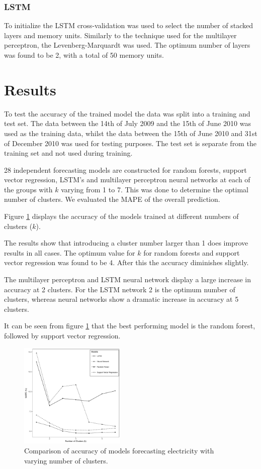 \subsubsection{LSTM}

To initialize the LSTM cross-validation was used to select the number of stacked layers and memory units. Similarly to the technique used for the multilayer perceptron, the Levenberg-Marquardt was used. The optimum number of layers was found to be 2, with a total of 50 memory units.



\section{Results}

To test the accuracy of the trained model the data was split into a training and test set. The data between the 14th of July 2009 and the 15th of June 2010 was used as the training data, whilst the data between the 15th of June 2010 and 31st of December 2010 was used for testing purposes. The test set is separate from the training set and not used during training. 

28 independent forecasting models are constructed for random forests, support vector regression, LSTM's and multilayer perceptron neural networks at each of the groups with $k$ varying from 1 to 7. This was done to determine the optimal number of clusters. We evaluated the MAPE of the overall prediction. 

Figure \ref{fig:results} displays the accuracy of the models trained at different numbers of clusters ($k$). 

The results show that introducing a cluster number larger than 1 does improve results in all cases. The optimum value for $k$ for random forests and support vector regression was found to be 4. After this the accuracy diminishes slightly.

The multilayer perceptron and LSTM neural network display a large increase in accuracy at 2 clusters. For the LSTM network 2 is the optimum number of clusters, whereas neural networks show a dramatic increase in accuracy at 5 clusters.

It can be seen from figure \ref{fig:results} that the best performing model is the random forest, followed by support vector regression. 

\begin{figure}
	\includegraphics[width=0.45\textwidth]{Chapter5/figures/results.pdf}
	\caption{Comparison of accuracy of models forecasting electricity with varying number of clusters.}
	\label{fig:results}
\end{figure}

